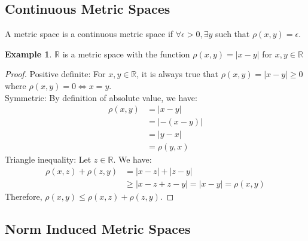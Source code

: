 \documentclass[12pt, reqno]{amsart}
\theoremstyle{definition}
\newtheorem{example}[theorem]{Example}
\numberwithin{equation}{section}
\newcommand{\dR}{{\mathbb R}}
\begin{document}
     \subsection{Continuous Metric Spaces}
     A metric space is a continuous metric space if $\forall \epsilon>0, \exists y $ such that $\rho(x,y) = \epsilon$.
    \begin{example} \label{absolute ms}
         $\dR$ is a metric space with the function $\rho(x, y) = |x-y|$ for $x,y \in \dR$
    \begin{proof}
        Positive definite: For $x, y \in \dR$, it is always true that ${\rho(x,y) = |x-y| \geq 0}$ where $\rho(x,y)=0 \iff x=y$.\\
        Symmetric: By definition of absolute value, we have:
        \begin{align*}
        \rho(x,y) &= |x-y| \\
                  &= |-(x-y)|\\
                  &= |y-x| \\
                  &= \rho(y,x)
        \end{align*}
        Triangle inequality: Let $z \in \dR$. We have:
        \begin{align*}
        \rho(x,z) + \rho(z,y) &= |x-z| + |z-y|\\
                              &\geq |x-z+z-y| = |x-y| = \rho(x,y)
        \end{align*}
        Therefore, $\rho(x,y) \leq \rho(x, z) + \rho(z, y)$.
        \end{proof}
    \end{example}
    
     \subsection{Norm Induced Metric Spaces}
    
\end{document}

